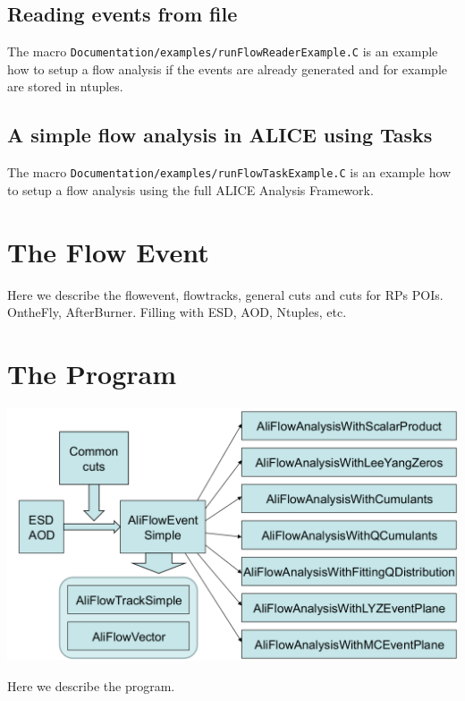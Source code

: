 \documentclass[a5paper]{book}
\numberwithin{equation}{subsection}
\begin{document}
\section{Reading events from file}
The macro \texttt{Documentation/examples/runFlowReaderExample.C} is an example how to setup a flow analysis if the events are already generated and
for example are stored in ntuples.
 
\section{A simple flow analysis in ALICE using Tasks}
The macro \texttt{Documentation/examples/runFlowTaskExample.C} is an example how to setup a flow analysis using the full ALICE Analysis Framework.


\chapter{The Flow Event}
\label{flowevent}
Here we describe the flowevent, flowtracks, general cuts and cuts for RPs POIs.
OntheFly, AfterBurner. Filling with ESD, AOD, Ntuples, etc.  

\chapter{The Program}
\label{The Program}
\begin{center}
	\includegraphics[width=1.\textwidth]{figs/flowChart.png}
\end{center}
Here we describe the program.
\end{document}
